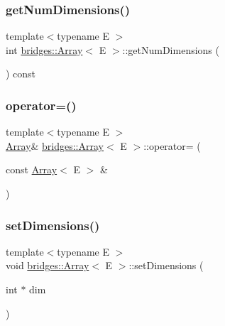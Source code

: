 \subsubsection{\texorpdfstring{get\+Num\+Dimensions()}{getNumDimensions()}}
{\footnotesize\ttfamily template$<$typename E $>$ \\
int \mbox{\hyperlink{classbridges_1_1_array}{bridges\+::\+Array}}$<$ E $>$\+::get\+Num\+Dimensions (\begin{DoxyParamCaption}{ }\end{DoxyParamCaption}) const\hspace{0.3cm}{\ttfamily [inline]}}

\mbox{\label{classbridges_1_1_array_af8a8b4fc43f57020db39207c80403e6f}} 
\subsubsection{\texorpdfstring{operator=()}{operator=()}}
{\footnotesize\ttfamily template$<$typename E $>$ \\
\mbox{\hyperlink{classbridges_1_1_array}{Array}}\& \mbox{\hyperlink{classbridges_1_1_array}{bridges\+::\+Array}}$<$ E $>$\+::operator= (\begin{DoxyParamCaption}\item[{const \mbox{\hyperlink{classbridges_1_1_array}{Array}}$<$ E $>$ \&}]{ }\end{DoxyParamCaption})\hspace{0.3cm}{\ttfamily [delete]}}

\mbox{\label{classbridges_1_1_array_a4e179915ab7820bbafe9b3433656b182}} 
\subsubsection{\texorpdfstring{set\+Dimensions()}{setDimensions()}}
{\footnotesize\ttfamily template$<$typename E $>$ \\
void \mbox{\hyperlink{classbridges_1_1_array}{bridges\+::\+Array}}$<$ E $>$\+::set\+Dimensions (\begin{DoxyParamCaption}\item[{int $\ast$}]{dim }\end{DoxyParamCaption})\hspace{0.3cm}{\ttfamily [inline]}}

